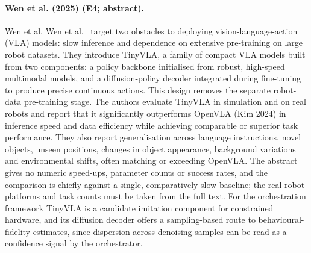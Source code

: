 \documentclass[10pt,a4paper]{article}
\begin{document}
\paragraph{Wen et al. (2025) (E4; abstract).} Wen et al. Wen et al.~\cite{Wen2025} target two obstacles to deploying vision-language-action (VLA) models: slow inference and dependence on extensive pre-training on large robot datasets. They introduce TinyVLA, a family of compact VLA models built from two components: a policy backbone initialised from robust, high-speed multimodal models, and a diffusion-policy decoder integrated during fine-tuning to produce precise continuous actions. This design removes the separate robot-data pre-training stage. The authors evaluate TinyVLA in simulation and on real robots and report that it significantly outperforms OpenVLA (Kim 2024) in inference speed and data efficiency while achieving comparable or superior task performance. They also report generalisation across language instructions, novel objects, unseen positions, changes in object appearance, background variations and environmental shifts, often matching or exceeding OpenVLA. The abstract gives no numeric speed-ups, parameter counts or success rates, and the comparison is chiefly against a single, comparatively slow baseline; the real-robot platforms and task counts must be taken from the full text. For the orchestration framework TinyVLA is a candidate imitation component for constrained hardware, and its diffusion decoder offers a sampling-based route to behavioural-fidelity estimates, since dispersion across denoising samples can be read as a confidence signal by the orchestrator.
\end{document}
